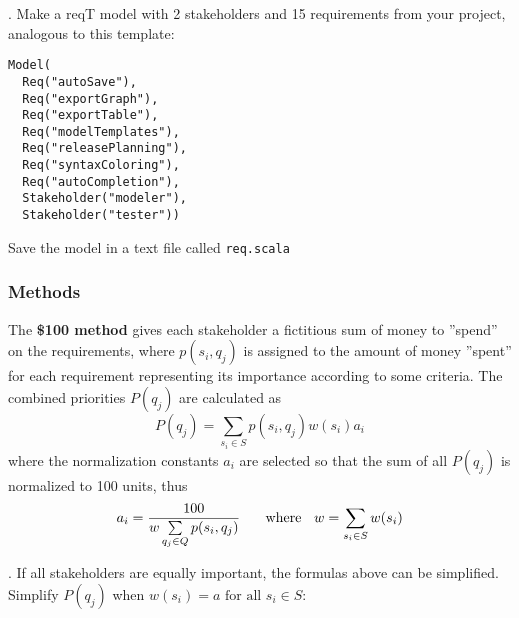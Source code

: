 \documentclass[11pt]{article}
\begin{document}
  \begin{framed}
 . Make a reqT model with 2 stakeholders and 15 requirements from your project, analogous to this template: 
 
\begin{lstlisting}
Model(
  Req("autoSave"),
  Req("exportGraph"), 
  Req("exportTable"), 
  Req("modelTemplates"), 
  Req("releasePlanning"), 
  Req("syntaxColoring"), 
  Req("autoCompletion"), 
  Stakeholder("modeler"),
  Stakeholder("tester"))     
\end{lstlisting}
Save the model in a text file called \verb+req.scala+
\end{framed}
 
\subsubsection{Methods}\label{section:priomethods}

\noindent The {\bf \$100 method} gives each stakeholder a fictitious sum of money to ''spend'' on the requirements, where $p(s_i, q_j)$ is assigned to the amount of money ''spent'' for each requirement representing its importance according to some criteria. The combined priorities $P(q_j)$ are calculated as  
\begin{displaymath}
P(q_j) = \sum\limits_{s_i \in S} p(s_i, q_j) w(s_i) a_i
\end{displaymath}
where the normalization constants $a_i$ are selected so that the sum of all $P(q_j)$ is normalized to 100 units, thus 
\begin{displaymath}
a_i = \frac{100}{   w \sum\limits_{q_j \in Q} p(s_i, q_j)} \text{ \hspace{4mm} where \hspace{2mm}}
w = \sum\limits_{s_i \in S} w(s_i)
\end{displaymath} 

\begin{framed}
. If all stakeholders are equally important, the formulas above can be simplified. Simplify $P(q_j)$ when $w(s_i) = a \text{ for all  } s_i \in S$: \newline\newline\newline\newline    \underline{\hspace{11cm}}
 \end{framed}
\end{document}
